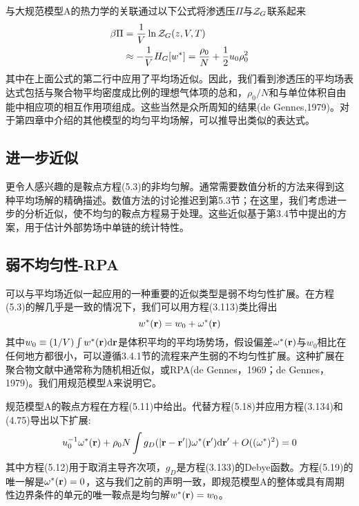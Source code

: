 与大规范模型A的热力学的关联通过以下公式将渗透压$\Pi$与$\mathcal{Z}_G$联系起来
\begin{equation}
\begin{aligned}
\beta\Pi&=\frac{1}{V}\ln\mathcal{Z}_G(z,V,T)\\
&\approx-\frac{1}{V}H_G[w^*]=\frac{\rho_0}{N}+\frac{1}{2}u_0\rho_0^2
\end{aligned}
\end{equation}
其中在上面公式的第二行中应用了平均场近似。因此，我们看到渗透压的平均场表达式包括与聚合物平均密度成比例的理想气体项的总和，$\rho_0/N$和与单位体积自由能中相应项的相互作用项组成。这些当然是众所周知的结果(de Gennes,1979)。对于第四章中介绍的其他模型的均匀平均场解，可以推导出类似的表达式。
\subsection{进一步近似}
更令人感兴趣的是鞍点方程(5.3)的非均匀解。通常需要数值分析的方法来得到这种平均场解的精确描述。数值方法的讨论推迟到第5.3节；在这里，我们考虑进一步的分析近似，使不均匀的鞍点方程易于处理。这些近似基于第3.4节中提出的方案，用于估计外部势场中单链的统计特性。
\subsection{弱不均匀性-RPA}
可以与平均场近似一起应用的一种重要的近似类型是弱不均匀性扩展。在方程(5.3)的解几乎是一致的情况下，我们可以用方程(3.113)类比得出
\begin{equation}
w^*(\mathbf{r})=w_0+\omega^*(\mathbf{r})
\end{equation}
其中$w_0\equiv(1/V)\int w^*(\mathbf{r})\mathrm{d}\mathbf{r}$是体积平均的平均场势场，假设偏差$\omega^*(\mathbf{r})$与$w_0$相比在任何地方都很小，可以遵循3.4.1节的流程来产生弱的不均匀性扩展。这种扩展在聚合物文献中通常称为随机相近似，或RPA(de Gennes，1969；de Gennes，1979)。我们用规范模型A来说明它。

规范模型A的鞍点方程在方程(5.11)中给出。代替方程(5.18)并应用方程(3.134)和(4.75)导出以下扩展:
\begin{equation}
u_0^{-1}\omega^*(\mathbf{r})+\rho_0N\int g_D(\left|\mathbf{r}-\mathbf{r}'\right|)\omega^*(\mathbf{r}')\mathrm{d}\mathbf{r}'+O((\omega^*)^2)=0
\end{equation}
其中方程(5.12)用于取消主导齐次项，$g_D$是方程(3.133)的Debye函数。方程(5.19)的唯一解是$\omega^*(\mathbf{r})=0$，这与我们之前的声明一致，即规范模型A的整体或具有周期性边界条件的单元的唯一鞍点是均匀解$w^*(\mathbf{r})=w_0$。

